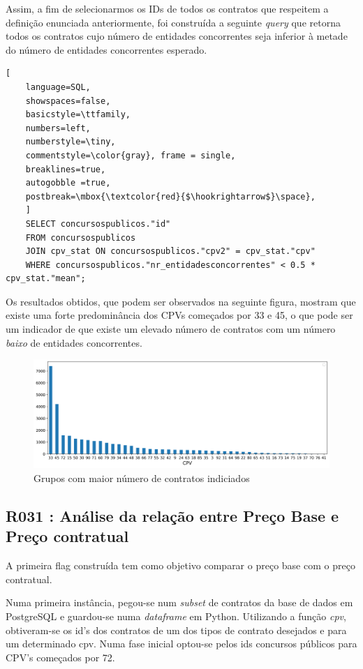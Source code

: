 Assim, a fim de selecionarmos os IDs de todos os contratos que respeitem a definição enunciada anteriormente, foi construída a seguinte \textit{query} que retorna todos os contratos cujo número de entidades concorrentes seja inferior à metade do número de entidades concorrentes esperado.  

\begin{lstlisting}[
	language=SQL,
	showspaces=false,
	basicstyle=\ttfamily,
	numbers=left,
	numberstyle=\tiny,
	commentstyle=\color{gray}, frame = single,
	breaklines=true,
	autogobble =true,
	postbreak=\mbox{\textcolor{red}{$\hookrightarrow$}\space},
	]
	SELECT concursospublicos."id"
	FROM concursospublicos 
	JOIN cpv_stat ON concursospublicos."cpv2" = cpv_stat."cpv"
	WHERE concursospublicos."nr_entidadesconcorrentes" < 0.5 * cpv_stat."mean";
\end{lstlisting}

Os resultados obtidos, que podem ser observados na seguinte figura, mostram que existe uma forte predominância dos CPVs começados por 33 e 45, o que pode ser um indicador de que existe um elevado número de contratos com um número \textit{baixo} de entidades concorrentes. 

\begin{figure}[H]
	\centering
	\includegraphics[width=\textwidth]{imagens/r019.png}
	\caption{Grupos com maior número de contratos indiciados}
	\label{}
\end{figure}





\subsection{R031 : Análise da relação entre Preço Base e Preço contratual}

A primeira flag construída tem como objetivo comparar o preço base com o preço contratual.


Numa primeira instância, pegou-se num \textit{subset} de contratos da base de dados em PostgreSQL e guardou-se numa \textit{dataframe} em Python. 
Utilizando a função \textit{cpv}, obtiveram-se os id's dos contratos de um dos tipos de contrato desejados e para um determinado cpv. Numa fase inicial optou-se pelos ids concursos públicos para CPV's começados por 72. 


